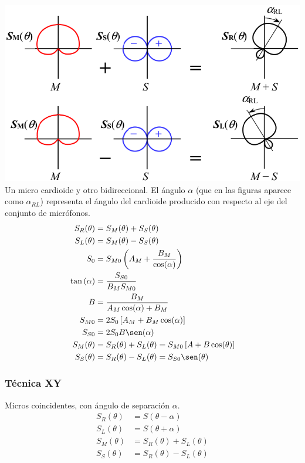 \documentclass[a4paper, 8pt]{extarticle}
\renewcommand{\sin}{\sen}
\begin{document}
\begin{multicols}{3}
  \includegraphics[width=0.8\linewidth]{Micros MS.png}
  Un micro cardioide y otro bidireccional. El ángulo $\alpha $ (que en las figuras aparece como $\alpha _{RL}$) representa el ángulo del cardioide producido con respecto al eje del conjunto de micrófonos.
  \begin{align*}
    S_R (\theta )               & = S_M (\theta ) + S_S (\theta )                                                \\
    S_L (\theta )               & = S_M (\theta ) - S_S (\theta )                                                \\
    S_0                         & = S_{M0} \left( A_M + \frac{B_M}{\cos (\alpha )} \right)                       \\
    \tan \left( \alpha  \right) & = \frac{S_{S0}}{B_M S_{M0}}                                                    \\
    B                           & = \frac{B_M}{A_M \cos (\alpha ) + B_M}                                         \\
    S_{M0}                      & = 2 S_0 \left[A_M + B_M \cos (\alpha ) \right]                                 \\
    S_{S0}                      & = 2 S_0 B \sin (\alpha )                                                       \\
    S_M ( \theta )              & = S_R ( \theta ) + S_L ( \theta ) = S_{M0} \left[ A + B \cos (\theta ) \right] \\
    S_S ( \theta )              & = S_R ( \theta ) - S_L ( \theta ) = S_{S0} \sen (\theta )
  \end{align*}

  \subsubsection{Técnica XY}
  Micros coincidentes, con ángulo de separación $\alpha$.
  \begin{align*}
    S_R (\theta )  & = S(\theta - \alpha )             \\
    S_L (\theta )  & = S(\theta + \alpha  )            \\
    S_M ( \theta ) & = S_R ( \theta ) + S_L ( \theta ) \\
    S_S ( \theta ) & = S_R ( \theta ) - S_L ( \theta )
  \end{align*}



\end{multicols}
\end{document}
